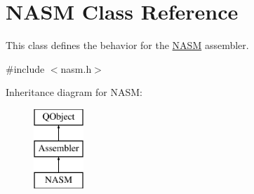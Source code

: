 \hypertarget{class_n_a_s_m}{}\section{N\+A\+S\+M Class Reference}
\label{class_n_a_s_m}


This class defines the behavior for the \hyperlink{class_n_a_s_m}{N\+A\+S\+M} assembler.  




{\ttfamily \#include $<$nasm.\+h$>$}

Inheritance diagram for N\+A\+S\+M\+:\begin{figure}[H]
\begin{center}
\leavevmode
\includegraphics[height=3.000000cm]{class_n_a_s_m}
\end{center}
\end{figure}

